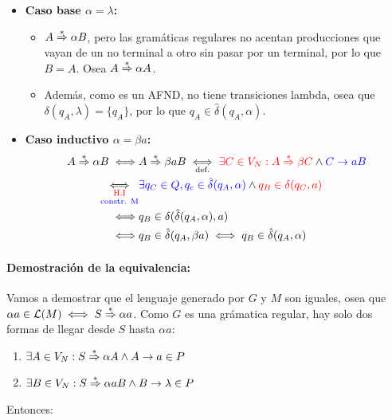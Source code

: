 \begin{itemize}
  \item \textbf{Caso base \(\alpha = \lambda\):}
        \begin{itemize}
          \item \(A\deriva \alpha B\), pero las gramáticas regulares no acentan producciones que vayan de un no terminal a otro sin pasar por un terminal, por lo que \(B = A\). Osea \(A\deriva \alpha A\).
          \item Además, como es un AFND, no tiene transiciones lambda, osea que \(\delta(q_A, \lambda) = \{q_A\}\), por lo que \(q_A\in\hat\delta(q_A, \alpha)\).
        \end{itemize}
  \item \textbf{Caso inductivo \(\alpha = \beta a\):}
        \begin{align*}
          A\deriva \alpha B   \iff            & A\deriva \beta aB \iffa{def.} \red{\exists C\in V_N: A \deriva \beta C} \wedge \blue{C\rightarrow aB} \\
          \iffab{\red{H.I}}{\blue{constr. M}} & \blue{\exists q_C\in Q, q_c\in\hat\delta(q_A,\alpha)} \land \red{q_B\in\delta(q_C,a)}                 \\
          \iff                                & q_B\in \delta(\hat\delta(q_A,\alpha),a)                                                               \\
          \iff                                & q_B\in\hat\delta(q_A, \beta a) \iff q_B\in\hat\delta(q_A, \alpha)                                     \\
        \end{align*}
\end{itemize}

\paragraph{Demostración de la equivalencia:} Vamos a demostrar que el lenguaje generado por \(G\) y \(M\) son iguales, osea que \(\alpha a\in\mathcal{L}(M)\iff S\deriva \alpha a\).
Como \(G\) es una grámatica regular, hay solo dos formas de llegar desde \(S\) hasta \(\alpha a\):
\begin{enumerate}
  \item \(\exists A\in V_N: S \deriva \alpha A \wedge A \rightarrow a \in P\)
  \item \(\exists B\in V_N: S \deriva \alpha aB \wedge B \rightarrow \lambda \in P\)
\end{enumerate}
Entonces:

